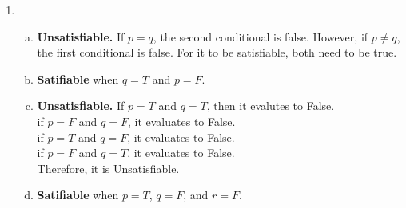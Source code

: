 \documentclass[14pt]{extarticle} %
\begin{document}
\begin{enumerate}
    \item
    \begin{enumerate}[a.]
        \item \textbf{Unsatisfiable.} If $p = q$, the second conditional is false. 
                However, if $p \neq q$, the first conditional is false. For it to be satisfiable, both need to be true.
        \item \textbf{Satifiable} when $q = T$ and $p = F$.
        \item \textbf{Unsatisfiable.} If $p = T$ and $q = T$, then it evalutes to False. \\
                if $p = F$ and $q = F$, it evaluates to False. \\
                if $p = T$ and $q = F$, it evaluates to False. \\
                if $p = F$ and $q = T$, it evaluates to False. \\
                Therefore, it is Unsatisfiable.
        \item \textbf{Satifiable} when $p = T$, $q = F$, and $r = F$.
    \end{enumerate}

\end{enumerate}
\end{document}
